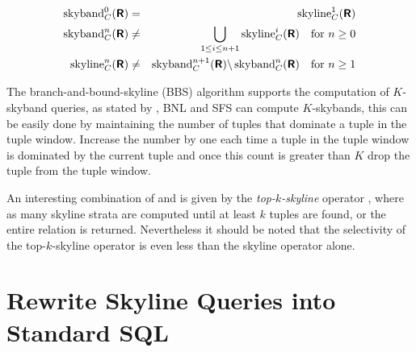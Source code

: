 \begin{eqnarray}
\skyband_C^0(\relation{R}) &=& \skyline_C^1(\relation{R}) \label{equ:skyband} \\
\skyband_C^n(\relation{R}) &\not=& \bigunion_{1 \le i \le n+1} \skyline_C^i(\relation{R}) \quad \textnormal{for}\ n \ge 0\label{equ:skybandgeneral} \\
\skyline_C^n(\relation{R}) &\not=& \skyband_C^{n+1}(\relation{R}) \difference \skyband_C^n(\relation{R}) \quad \textnormal{for}\ n \ge 1
\end{eqnarray}

The branch-and-bound-skyline (BBS) algorithm \citep{Papadias2005} supports the
computation of $K$-skyband queries, as stated by \citet{Papadias2005},
BNL and SFS can compute $K$-skybands, this can be easily done by
maintaining the number of tuples that dominate a tuple in the tuple
window. Increase the number by one each time a tuple in the tuple
window is dominated by the current tuple and once this count is
greater than $K$ drop the tuple from the tuple window.


An interesting combination of  and
 is given by the
\emph{top-$k$-skyline} operator
\citep{Brando2007, Goncalves2005a, Goncalves2005}, where as many 
skyline strata are computed until at least $k$ tuples are found, or
the entire relation is returned.  Nevertheless it should be noted that
the selectivity of the top-$k$-skyline operator is even less
than the skyline operator alone.


\section{Rewrite Skyline Queries into Standard SQL}
\label{sec:rewrite-to-sql}

